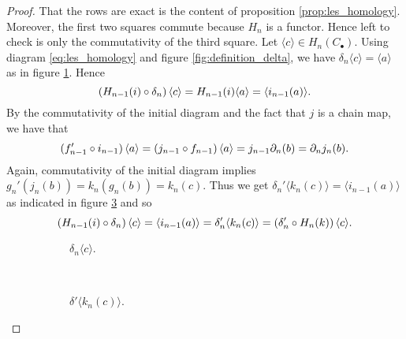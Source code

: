 \begin{proof}
	That the rows are exact is the content of proposition \ref{prop:les_homology}. Moreover, the first two squares commute because $H_n$ is a functor. Hence left to check is only the commutativity of the third square. Let $\langle c \rangle \in H_n(C_\bullet)$. Using diagram \ref{eq:les_homology} and figure \ref{fig:definition_delta}, we have $\delta_n\langle c \rangle = \langle a \rangle$ as in figure \ref{fig:delta_n_c}. Hence
	\begin{equation*}
		\del[0]{H_{n - 1}(i) \circ \delta_n}\langle c \rangle = H_{n - 1}(i)\langle a \rangle = \langle i_{n - 1}(a)\rangle.
	\end{equation*}
	By the commutativity of the initial diagram and the fact that $j$ is a chain map, we have that
	\begin{equation*}
		\del[0]{f'_{n - 1} \circ i_{n - 1}}\langle a \rangle = \del[0]{j_{n - 1} \circ f_{n - 1}}\langle a \rangle = j_{n - 1}\partial_n(b) = \partial_nj_n(b).
	\end{equation*}
	Again, commutativity of the initial diagram implies $g_n'(j_n(b)) = k_n(g_n(b)) = k_n(c)$. Thus we get $\delta_n'\langle k_n(c)\rangle = \langle i_{n - 1}(a) \rangle$ as indicated in figure \ref{fig:delta_n_prime_k_c} and so
	\begin{equation*}
		\del[0]{H_{n - 1}(i) \circ \delta_n}\langle c \rangle = \langle i_{n - 1}(a)\rangle = \delta'_n \langle k_n(c) \rangle = \del[0]{\delta_n' \circ H_n(k)}\langle c \rangle.
	\end{equation*}
	\begin{figure}[h!tb]
		\centering
		\begin{subfigure}[b]{.5\textwidth}
			\centering
			\caption{$\delta_n\langle c \rangle$.}
			\label{fig:delta_n_c}
		\end{subfigure}
		~
		\begin{subfigure}[b]{.5\textwidth}
			\centering
			\caption{$\delta'\langle k_n(c) \rangle$.}
			\label{fig:delta_n_prime_k_c}					
		\end{subfigure}
		\caption{}
	\end{figure}
\end{proof}

